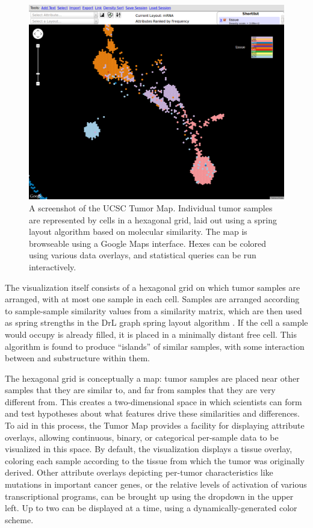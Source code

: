 \documentclass[11pt,proposal]{ucthesis}
\begin{document}
\begin{figure}[ht]
    \centering
    \includegraphics[width=1.0\textwidth]{figures/tumormap.png}
    \caption{A screenshot of the UCSC Tumor Map. Individual tumor samples are represented by cells in a hexagonal grid, laid out using a spring layout algorithm based on molecular similarity. The map is browseable using a Google Maps interface. Hexes can be colored using various data overlays, and statistical queries can be run interactively.}
    \label{fig:tumormap}
\end{figure}

The visualization itself consists of a hexagonal grid on which tumor samples are arranged, with at most one sample in each cell. Samples are arranged according to sample-sample similarity values from a similarity matrix, which are then used as spring strengths in the DrL graph spring layout algorithm \cite{martin2008drl}. If the cell a sample would occupy is already filled, it is placed in a minimally distant free cell. This algorithm is found to produce ``islands'' of similar samples, with some interaction between and substructure within them.

The hexagonal grid is conceptually a map: tumor samples are placed near other samples that they are similar to, and far from samples that they are very different from. This creates a two-dimensional space in which scientists can form and test hypotheses about what features drive these similarities and differences. To aid in this process, the Tumor Map provides a facility for displaying attribute overlays, allowing continuous, binary, or categorical per-sample data to be visualized in this space. By default, the visualization displays a tissue overlay, coloring each sample according to the tissue from which the tumor was originally derived. Other attribute overlays depicting per-tumor characteristics like mutations in important cancer genes, or the relative levels of activation of various transcriptional programs, can be brought up using the dropdown in the upper left. Up to two can be displayed at a time, using a dynamically-generated color scheme.
\end{document}
